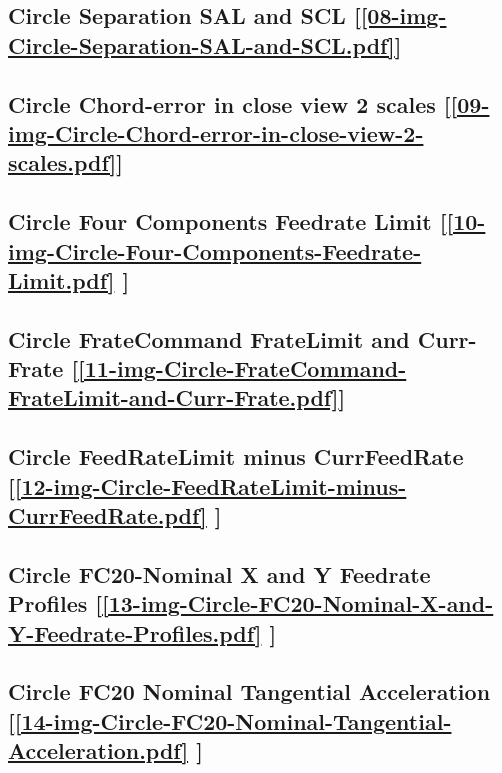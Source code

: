 \subsection       {Circle Separation SAL and SCL
[\ref      {08-img-Circle-Separation-SAL-and-SCL.pdf}] }
\label{ssec-08-img-Circle-Separation-SAL-and-SCL.pdf}

\subsection       {Circle Chord-error in close view 2 scales
[\ref      {09-img-Circle-Chord-error-in-close-view-2-scales.pdf}] }
\label{ssec-09-img-Circle-Chord-error-in-close-view-2-scales.pdf}

\subsection       {Circle Four Components Feedrate Limit
[\ref      {10-img-Circle-Four-Components-Feedrate-Limit.pdf} ] }
\label{ssec-10-img-Circle-Four-Components-Feedrate-Limit.pdf}

\subsection    {Circle FrateCommand FrateLimit and Curr-Frate
[\ref      {11-img-Circle-FrateCommand-FrateLimit-and-Curr-Frate.pdf}] }
\label{ssec-11-img-Circle-FrateCommand-FrateLimit-and-Curr-Frate.pdf}

\subsection     {Circle FeedRateLimit minus CurrFeedRate
[\ref      {12-img-Circle-FeedRateLimit-minus-CurrFeedRate.pdf} ] }
\label{ssec-12-img-Circle-FeedRateLimit-minus-CurrFeedRate.pdf}

\subsection     {Circle FC20-Nominal X and Y Feedrate Profiles
[\ref      {13-img-Circle-FC20-Nominal-X-and-Y-Feedrate-Profiles.pdf} ] }
\label{ssec-13-img-Circle-FC20-Nominal-X-and-Y-Feedrate-Profiles.pdf}

\subsection     {Circle FC20 Nominal Tangential Acceleration
[\ref      {14-img-Circle-FC20-Nominal-Tangential-Acceleration.pdf} ] }
\label{ssec-14-img-Circle-FC20-Nominal-Tangential-Acceleration.pdf}

